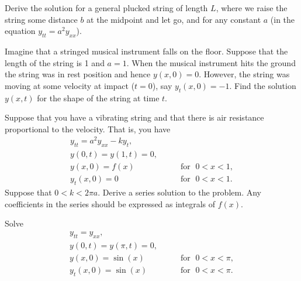 \documentclass[12pt]{book}
\begin{document}
\begin{exercise}
Derive the solution for a general plucked string of length $L$, where we
raise the string some distance $b$ at the midpoint and let go, and for any
constant $a$ (in the equation $y_{tt} = a^2 y_{xx}$).
\end{exercise}

\begin{exercise}
Imagine that a stringed musical instrument falls on the floor.  Suppose that
the length of the string is 1 and $a=1$.  When the musical instrument hits
the ground the string was in rest position and hence $y(x,0) = 0$.  However,
the string was moving at some velocity at impact ($t=0$),
say $y_t(x,0) = -1$.  Find the
solution
$y(x,t)$ for the shape of the string at time $t$.
\end{exercise}

\begin{exercise}[challenging]
Suppose that you have a vibrating string and that
there is air resistance proportional to the velocity.  That is, you have
\begin{equation*}
\begin{array}{ll}
y_{tt} = a^2 y_{xx} - k y_t , &  \\
y(0,t) = y(1,t) = 0 , &  \\
y(x,0) = f(x) & \qquad \text{for } \; 0 < x < 1 , \\
y_t(x,0) = 0 & \qquad \text{for } \; 0 < x < 1 .
\end{array}
\end{equation*}
Suppose that $0 < k < 2 \pi a$.
Derive a series solution to the problem.  Any coefficients in the series
should be expressed as integrals of $f(x)$.
\end{exercise}

\setcounter{exercise}{100}

\begin{exercise}
Solve
\begin{equation*}
\begin{array}{ll}
y_{tt} = y_{xx} , &  \\
y(0,t) = y(\pi,t) = 0 , &  \\
y(x,0) = \sin(x) & \qquad \text{for } \; 0 < x < \pi , \\
y_t(x,0) = \sin(x) & \qquad \text{for } \; 0 < x < \pi .
\end{array}
\end{equation*}
\end{exercise}
\end{document}
